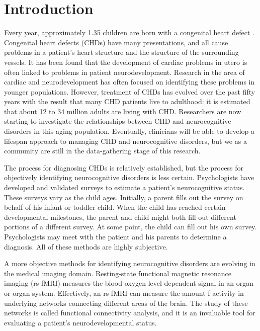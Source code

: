 \chapter{Introduction}
\label{ch:intro}

Every year, approximately 1.35 children are born with a congenital heart defect \cite{VanderLinde2011}. Congenital heart defects (CHDs) have many presentations, and all cause problems in a patient's heart structure and the structure of the surrounding vessels. It has been found that the development of cardiac problems in utero is often linked to problems in patient neurodevelopment. Research in the area of cardiac and neurodevelopment has often focused on identifying these problems in younger populations. However, treatment of CHDs has evolved over the past fifty years with the result that many CHD patients live to adulthood: it is estimated that about 12 to 34 million adults are living with CHD. Researchers are now starting to investigate the relationships between CHD and neurocognitive disorders in this aging population. Eventually, clinicians will be able to develop a lifespan approach to managing CHD and neurocognitive disorders, but we as a community are still in the data-gathering stage of this research.

The process for diagnosing CHDs is relatively established, but the process for objectively identifying neurocognitive disorders is less certain. Psychologists have developed and validated surveys to estimate a patient's neurocognitive status. These surveys vary as the child ages. Initially, a parent fills out the survey on behalf of his infant or toddler child. When the child has reached certain developmental milestones, the parent and child might both fill out different portions of a different survey. At some point, the child can fill out his own survey. Psychologists may meet with the patient and his parents to determine a diagnosis. All of these methods are highly subjective. 

A more objective methods for identifying neurocognitive disorders are evolving in the medical imaging domain. 
Resting-state functional magnetic resonance imaging (rs-fMRI) measures the blood oxygen level dependent signal in an organ or organ system. Effectively, an rs-fMRI can measure the amount f activity in underlying networks connecting different areas of the brain. The study of these networks is called functional connectivity analysis, and it is an invaluable tool for evaluating a patient's neurodevelopmental status. 

